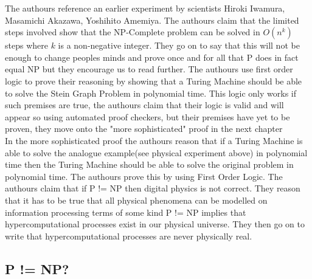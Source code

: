 \documentclass{report}
\begin{document}
The authours reference an earlier experiment by scientists Hiroki Iwamura, Masamichi Akazawa, Yoshihito Amemiya\cite{Iwamura}.  The authours claim that the limited steps involved show that the NP-Complete problem can be solved in $O(n^k)$ steps where $k$ is a non-negative integer.  They go on to say that this will not be enough to change peoples minds and prove once and for all that P does in fact equal NP but they encourage us to read further.  The authours use first order logic to prove their reasoning by showing that a Turing Machine should be able to solve the Stein Graph Problem\cite{Steiner} in polynomial time.  This logic only works if such premises are true, the authours claim that their logic is valid and will appear so using automated proof checkers, but their premises have yet to be proven, they move onto the "more sophisticated" proof in the next chapter\cite{PVsNPSolved}
\\
In the more sophisticated proof the authours reason that if a Turing Machine is able to solve the analogue example(see physical experiment above) in polynomial time then the Turing Machine should be able to solve the original problem in polynomial time.  The authours prove this by using First Order Logic\cite{}.  The authours claim that if P != NP then digital physics\cite{} is not correct.  They reason that it has to be true that all physical phenomena can be modelled on information processing terms of some kind P != NP implies that hypercomputational processes\cite{} exist in our physical universe.  They then go on to write that hypercomputational processes are never physically real.
\subsection{P != NP?}
\end{document}
